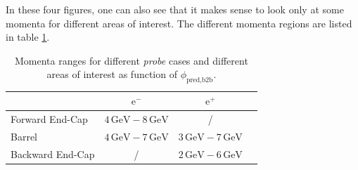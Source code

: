 \documentclass[a4paper,11pt,twosided,final,german,openbib,pdftex,listof=totoc,bibliography=totoc]{scrbook}
\begin{document}
In these four figures, one can also see that it makes sense to look only at some momenta for different areas of interest. The different momenta regions are listed in table \ref{tab:RTPMDTable}.


\begin{table}[h!]
	\centering
	\begin{tabular}{lccc}
		&$\textrm{e}^-$ &$\textrm{e}^+$\\
		\hline
		Forward End-Cap &$4\,\textrm{GeV} - 8\,\textrm{GeV}$&/\\
		Barrel &$4\,\textrm{GeV} - 7\,\textrm{GeV}$&$3\,\textrm{GeV} - 7\,\textrm{GeV}$\\
		Backward End-Cap & /&$2\,\textrm{GeV} - 6\,\textrm{GeV}$\\	
	\end{tabular}
	
	\caption[Areas Of Interest Different Momenta Ranges For Tracking Efficiency As Function Of $\phi_{\textrm{pred,b2b}}$]{Momenta ranges for different \textit{probe} cases and different areas of interest as function of $\phi_{\textrm{pred,b2b}}$.}
	\label{tab:RTPMDTable}
\end{table}
\end{document}
